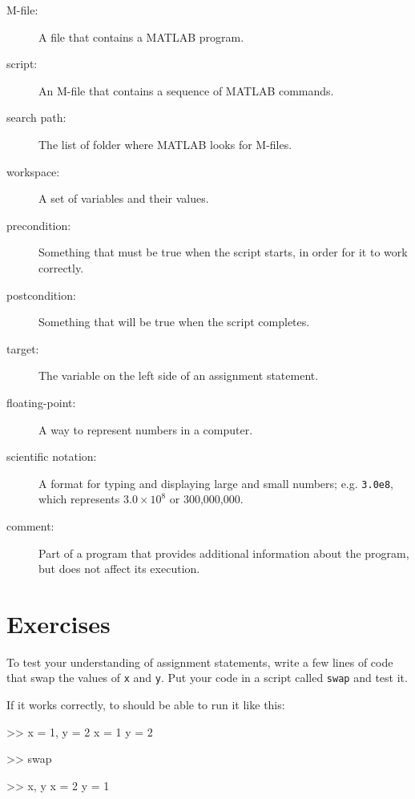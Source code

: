 \documentclass[
]{book}
\numberwithin{Answer}{chapter}
\numberwithin{Exercise}{chapter}
\begin{document}
\begin{description}

\item[M-file:] A file that contains a MATLAB program.

\item[script:] An M-file that contains a sequence of MATLAB commands.

\item[search path:] The list of folder where MATLAB looks for
M-files.

\item[workspace:] A set of variables and their values.

\item[precondition:] Something that must be true when the script
starts, in order for it to work correctly.

\item[postcondition:] Something that will be true when the script
completes.

\item[target:] The variable on the left side of an assignment statement.


\item[floating-point:] A way to represent numbers in a computer.

\item[scientific notation:] A format for typing and displaying large
and small numbers; e.g. {\tt 3.0e8}, which represents $3.0 \times 10^8$
or 300,000,000.

\item[comment:] Part of a program that provides additional information
about the program, but does not affect its execution.

\end{description}


\section{Exercises}



\begin{ex}
To test your understanding of assignment statements, write a few lines of code that swap the values of {\tt x} and {\tt y}. 
Put your code in a script called {\tt swap} and test it.

If it works correctly, to should be able to run it like this:

\begin{code}
>> x = 1, y = 2
x = 1
y = 2

>> swap

>> x, y
x = 2
y = 1
\end{code}


\end{ex}
\end{document}

